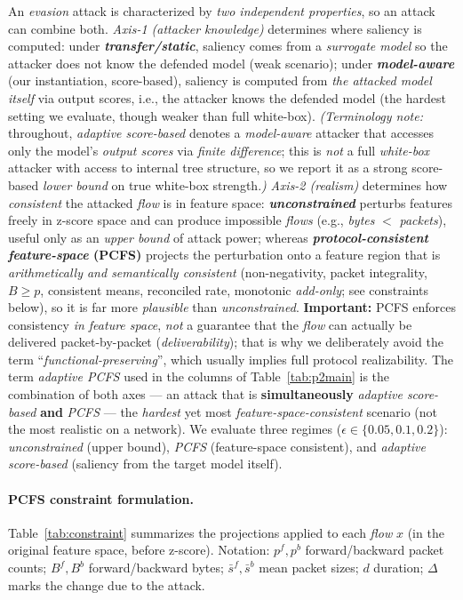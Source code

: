 \documentclass[preprint,12pt,authoryear]{elsarticle}
\begin{document}
An \emph{evasion} attack is characterized by \emph{two independent properties}, so
an attack can combine both. \emph{Axis-1 (attacker knowledge)} determines where
saliency is computed: under \textbf{\emph{transfer/static}}, saliency comes from a
\emph{surrogate model} so the attacker does not know the defended model (weak
scenario); under \textbf{\emph{model-aware}} (our instantiation, score-based), saliency is computed from
\emph{the attacked model itself} via output scores, i.e., the attacker knows the defended model
(the hardest setting we evaluate, though weaker than full white-box). \emph{(Terminology note:} throughout, \emph{adaptive score-based} denotes a \emph{model-aware} attacker that accesses only the model's \emph{output scores} via \emph{finite difference}; this is \emph{not} a full \emph{white-box} attacker with access to internal tree structure, so we report it as a strong score-based \emph{lower bound} on true white-box strength.\emph{)} \emph{Axis-2 (realism)} determines how \emph{consistent} the
attacked \emph{flow} is in feature space: \textbf{\emph{unconstrained}} perturbs
features freely in z-score space and can produce impossible \emph{flows} (e.g.,
\emph{bytes} $<$ \emph{packets}), useful only as an \emph{upper bound} of attack
power; whereas \textbf{\emph{protocol-consistent feature-space} (PCFS)} projects the
perturbation onto a feature region that is \emph{arithmetically and semantically
consistent} (non-negativity, packet integrality, $B\ge p$, consistent means,
reconciled rate, monotonic \emph{add-only}; see constraints below), so it is far
more \emph{plausible} than \emph{unconstrained}. \textbf{Important:} PCFS enforces
consistency \emph{in feature space}, \emph{not} a guarantee that the \emph{flow}
can actually be delivered packet-by-packet (\emph{deliverability}); that is why we
deliberately avoid the term ``\emph{functional-preserving}'', which usually implies
full protocol realizability. The term \emph{adaptive PCFS} used in the columns of
Table~\ref{tab:p2main} is the combination of both axes --- an attack that is
\textbf{simultaneously} \emph{adaptive score-based} \textbf{and} \emph{PCFS} --- the
\emph{hardest} yet most \emph{feature-space-consistent} scenario (not the most
realistic on a network). We evaluate three regimes
($\epsilon \in \{0.05, 0.1, 0.2\}$): \emph{unconstrained} (upper bound), \emph{PCFS}
(feature-space consistent), and \emph{adaptive score-based} (saliency from the target
model itself).

\paragraph{PCFS constraint formulation.} Table~\ref{tab:constraint} summarizes the
projections applied to each \emph{flow} $x$ (in the original feature space, before
z-score). Notation: $p^{f},p^{b}$ forward/backward packet counts; $B^{f},B^{b}$
forward/backward bytes; $\bar{s}^{f},\bar{s}^{b}$ mean packet sizes; $d$ duration;
$\Delta$ marks the change due to the attack.
\end{document}

